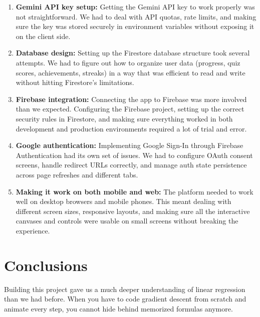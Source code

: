 \documentclass[12pt, a4paper]{article}
\begin{document}
\begin{enumerate}
    \item \textbf{Gemini API key setup:} Getting the Gemini API key to work properly was not straightforward. We had to deal with API quotas, rate limits, and making sure the key was stored securely in environment variables without exposing it on the client side.
    
    \item \textbf{Database design:} Setting up the Firestore database structure took several attempts. We had to figure out how to organize user data (progress, quiz scores, achievements, streaks) in a way that was efficient to read and write without hitting Firestore's limitations.
    
    \item \textbf{Firebase integration:} Connecting the app to Firebase was more involved than we expected. Configuring the Firebase project, setting up the correct security rules in Firestore, and making sure everything worked in both development and production environments required a lot of trial and error.
    
    \item \textbf{Google authentication:} Implementing Google Sign-In through Firebase Authentication had its own set of issues. We had to configure OAuth consent screens, handle redirect URLs correctly, and manage auth state persistence across page refreshes and different tabs.
    
    \item \textbf{Making it work on both mobile and web:} The platform needed to work well on desktop browsers and mobile phones. This meant dealing with different screen sizes, responsive layouts, and making sure all the interactive canvases and controls were usable on small screens without breaking the experience.
\end{enumerate}

\section{Conclusions}
\label{sec:conclusions}

Building this project gave us a much deeper understanding of linear regression than we had before. When you have to code gradient descent from scratch and animate every step, you cannot hide behind memorized formulas anymore.
\end{document}
